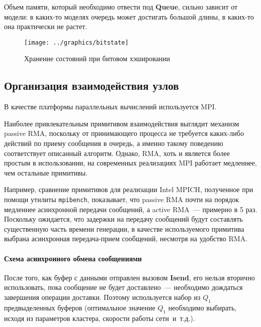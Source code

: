 \documentclass[12pt,a4paper,fleqn]{article}
\newcommand{\Code}[1]{\textbf{\mbox{#1}}}
\newcommand\etc{~и~т.д.}
\begin{document}
Объем памяти, который необходимо отвести под \Code{Queue}, сильно зависит от модели: в
каких-то моделях очередь может достигать большой длины, в каких-то она практически не
растет.

\begin{figure}[ht]
  \centering
  \texttt{[image: ../graphics/bitstate]}  
  \caption{Хранение состояний при битовом хэшировании}
  \label{fig:bitstate}
\end{figure}

\subsection{Организация взаимодействия узлов}

В качестве платформы параллельных вычислений используется MPI.

Наиболее привлекательным примитивом взаимодействия выглядит механизм passive RMA,
поскольку от принимающего процесса не требуется каких-либо действий по приему сообщения в
очередь, а именно такому поведению соответствует описанный алгоритм. Однако, RMA, хоть и
является более простым в использовании, на современных реализациях MPI работает медленнее,
чем остальные примитивы. 

Например, сравнение примитивов для реализации Intel MPICH, полученное при помощи утилиты
\texttt{mpibench}, показывает, что passive RMA почти на порядок медленнее асинхронной
передачи сообщений, а active RMA~--- примерно в 5 раз. Поскольку ожидается, что задержки
на передачу сообщений будут составлять существенную часть времени генерации, в качестве
используемого примитива выбрана асинхронная передача-прием сообщений, несмотря на удобство
RMA.

\paragraph{Схема асинхронного обмена сообщениями}

После того, как буфер с данными отправлен вызовом \Code{Isend}, его нельзя вторично
использовать, пока сообщение не будет доставлено~--- необходимо дождаться завершения
операции доставки. Поэтому используется набор из $Q_1$ предвыделенных буферов (оптимальное
значение $Q_1$ необходимо выбирать, исходя из параметров кластера, скорости работы
сети\etc).
\end{document}
